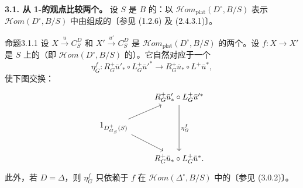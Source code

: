 \textbf{3.1. 从 1-的观点比较两个。}
设 $S$ 是 $B$ 的：以 $\mathcal{H}om_{\mathrm{plat}}(D^\circ,B/S)$ 表示 $\mathcal{H}om(D^\circ,B/S)$ 中由组成的〔参见 (1.2.6) 及 (2.4.3.1)〕。
\begin{SGAresult}{命题}{3.1.1}
设 $X\xrightarrow{u}C_S^D$ 和 $X'\xrightarrow{u'}C_S^D$ 是 $\mathcal{H}om_{\mathrm{plat}}(D^\circ,B/S)$ 的两个。设 $f:X\to X'$ 是 $S$ 上的（即 $\mathcal{H}om(D^\circ,B/S)$ 的）。它自然对应于一个
\[
\eta_G^f:R_G^+\bar u'_*\circ L_G^+\bar u'^*
\longrightarrow R_G^+\bar u_*\circ L^+\bar u^*,
\]
使下图交换：
\[
\begin{tikzcd}
& R_G^+\bar u'_*\circ L_G^+\bar u'^*\arrow[dd,"\eta_G^f"]\\
1_{D^+_{G_S}(S)}\arrow[ur]\arrow[dr]&\\
& R_G^+\bar u_*\circ L_G^+\bar u^* .
\end{tikzcd}
\]
此外，若 $D=\Delta$，则 $\eta_G^f$ 只依赖于 $f$ 在 $\mathcal{H}om(\Delta^\circ,B/S)$ 中的〔参见 (3.0.2)〕。
\end{SGAresult}
